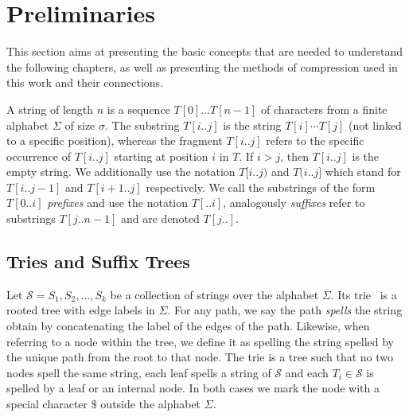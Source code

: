 \section{Preliminaries}\label{sec:prelim}


This section aims at presenting the basic concepts that are needed to understand the following chapters, as well as presenting the methods of compression used in this work and their connections.

A string of length $n$ is a sequence $T[0] \dots T[n-1]$ of characters from a finite alphabet $\Sigma$ of size $\sigma$. The substring $T[i..j]$ is the string $T[i] \cdots T[j]$ (not linked to a specific position), whereas the fragment $T[i..j]$ refers to the specific occurrence of $T[i..j]$ starting at position $i$ in $T$. If $i > j$, then $T[i..j]$ is the empty string. We additionally use the notation $T[i..j)$ and $T(i..j]$ which stand for $T[i..j-1]$ and $T[i+1..j]$ respectively. We call the substrings of the form $T[0..i]$ \emph{prefixes}  and use the notation $T[..i]$, analogously \emph{suffixes} refer to substrings $T[j..n-1]$ and are denoted $T[j..]$.

\subsection{Tries and Suffix Trees}
Let $\mathcal{S} = {S_1,S_2, ..., S_k}$ be a collection of strings over the alphabet $\Sigma$. Its trie~\cite{thue1912gegenseitige,de1959file,fredkin1960trie} is a rooted tree with edge labels in $\Sigma$.
For any path, we say the path \emph{spells} the string obtain by concatenating the label of the edges of the path.
Likewise, when referring to a node within the tree, we define it as spelling the string spelled by the unique path from the root to that node.
The trie is a tree such that no two nodes spell the same string, each leaf spells a string of $\mathcal{S}$ and each $T_i \in \mathcal{S}$ is spelled by a leaf or an internal node. In both cases we mark the node with a special character $\$$ outside the alphabet $\Sigma$.

